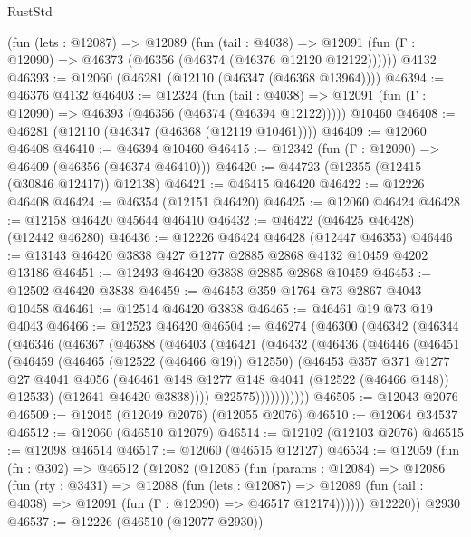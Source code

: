 \begin{lexlean}{RustStd}
\begin{coremodule}
    (fun (lets : @12087) =>
    @12089
      (fun (tail : @4038) =>
      @12091 (fun (Γ : @12090) => @46373 (@46356 (@46374 (@46376 @12120 @12122))))))
    @4132
@46393 := @12060 (@46281 (@12110 (@46347 (@46368 @13964))))
@46394 := @46376 @4132
@46403 := @12324
    (fun (tail : @4038) => @12091 (fun (Γ : @12090) => @46393 (@46356 (@46374 (@46394 @12122)))))
    @10460
@46408 := @46281 (@12110 (@46347 (@46368 (@12119 @10461))))
@46409 := @12060 @46408
@46410 := @46394 @10460
@46415 := @12342 (fun (Γ : @12090) => @46409 (@46356 (@46374 @46410)))
@46420 := @44723 (@12355 (@12415 (@30846 @12417)) @12138)
@46421 := @46415 @46420
@46422 := @12226 @46408
@46424 := @46354 (@12151 @46420)
@46425 := @12060 @46424
@46428 := @12158 @46420 @45644 @46410
@46432 := @46422 (@46425 @46428) (@12442 @46280)
@46436 := @12226 @46424 @46428 (@12447 @46353)
@46446 := @13143 @46420 @3838 @427 @1277 @2885 @2868 @4132 @10459 @4202 @13186
@46451 := @12493 @46420 @3838 @2885 @2868 @10459
@46453 := @12502 @46420 @3838
@46459 := @46453 @359 @1764 @73 @2867 @4043 @10458
@46461 := @12514 @46420 @3838
@46465 := @46461 @19 @73 @19 @4043
@46466 := @12523 @46420
@46504 := @46274
    (@46300
      (@46342
        (@46344
          (@46346
            (@46367
              (@46388
                (@46403
                  (@46421
                    (@46432
                      (@46436
                        (@46446
                          (@46451
                            (@46459
                              (@46465 (@12522 (@46466 @19)) @12550)
                              (@46453
                                @357
                                @371
                                @1277
                                @27
                                @4041
                                @4056
                                (@46461 @148 @1277 @148 @4041 (@12522 (@46466 @148)) @12533)
                                (@12641 @46420 @3838))))
                          @22575)))))))))))
@46505 := @12043 @2076
@46509 := @12045 (@12049 @2076) (@12055 @2076)
@46510 := @12064 @34537
@46512 := @12060 (@46510 @12079)
@46514 := @12102 (@12103 @2076)
@46515 := @12098 @46514
@46517 := @12060 (@46515 @12127)
@46534 := @12059
    (fun (fn : @302) =>
    @46512
      (@12082
        (@12085
          (fun (params : @12084) =>
          @12086
            (fun (rty : @3431) =>
            @12088
              (fun (lets : @12087) =>
              @12089 (fun (tail : @4038) => @12091 (fun (Γ : @12090) => @46517 @12174))))))
        @12220))
    @2930
@46537 := @12226 (@46510 (@12077 @2930))

\end{coremodule}
\end{lexlean}
